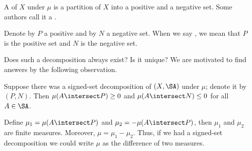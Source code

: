 A 
of $X$ under $\mu$
is a partition of $X$
into a positive and a negative set.
Some authors call it a
.


Denote by $P$ a positive
and by $N$ a negative set.
When we say ,
we mean that $P$ is
the positive set and $N$
is the negative set.


Does such a decomposition
always exist? Is it unique?
We are motivated to find
answers
by the following observation.

Suppose there was a signed-set
decomposition of $(X, \SA)$
under $\mu$; denote it by $(P, N)$.
Then
$\mu(A \intersect P) \geq 0$
and $\mu(A \intersect N) \leq 0$
for all $A \in \SA$.

Define
$\mu_1 = \mu(A \intersect P)$
and $\mu_2 = -\mu(A \intersect P)$,
then $\mu_1$ and $\mu_2$ are finite measures.
Moreover, $\mu = \mu_1 - \mu_2$.
Thus, if we had a signed-set decomposition
we could write $\mu$ as the difference
of two measures.
\strats
